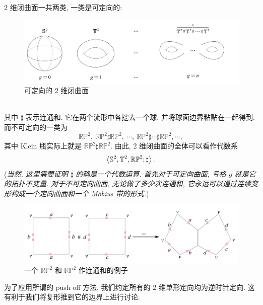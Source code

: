 	\begin{Example}[2 维闭曲面的代数表示]
        2 维闭曲面一共两类, 一类是可定向的:
        \begin{figure}[htbp]
            \centering
            \includegraphics[width=0.7\linewidth]{figures/Sec3-6.png}
            \caption{可定向的 2 维闭曲面}
        \end{figure}
        ~\\其中 $ \sharp $ 表示连通和. 它在两个流形中各挖去一个球, 并将球面边界粘贴在一起得到. 而不可定向的一类为
        \[
            \mathbb{RP}^2,\ \mathbb{RP}^2\sharp\mathbb{RP}^2,\ \cdots,\ \mathbb{RP}^2\sharp\cdots\sharp\mathbb{RP}^2,\cdots,
        \]
        其中 Klein 瓶实际上就是 $ \mathbb{RP}^2\sharp\mathbb{RP}^2 $. 由此, 2 维闭曲面的全体可以看作代数系
        \[
            \left\langle \mathbb{S}^2,\mathbb{T}^2,\mathbb{RP}^2;\sharp \right\rangle.
        \]
        (\textit{当然, 这里需要证明 $ \sharp $ 的确是一个代数运算. 首先对于可定向曲面, 亏格 $ g $ 就是它的拓扑不变量. 对于不可定向曲面, 无论做了多少次连通和, 它永远可以通过连续变形构成一个定向曲面和一个 M\"obius 带的形式.})
        \begin{figure}[htbp]
            \centering
            \includegraphics[width=0.7\linewidth]{figures/Sec3-7.png}
            \caption{一个 $ \mathbb{RP}^2 $ 和 $ \mathbb{RP}^2 $ 作连通和的例子}
        \end{figure}
    \end{Example}

	为了应用所谓的 push off 方法, 我们约定所有的 2 维单形定向均为逆时针定向. 这有利于我们将复形推到它的边界上进行讨论.

